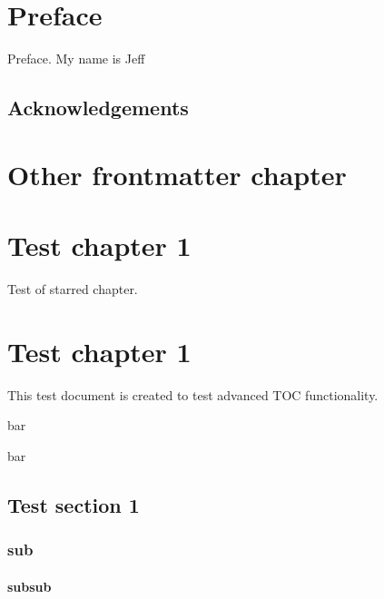 \documentclass{book}
\begin{document}
%

\frontmatter

\chapter{Preface}
Preface. My name is Jeff

\section{Acknowledgements}

\chapter[Other]{Other frontmatter chapter}

\tableofcontents

\mainmatter

\chapter*{Test chapter 1}
Test of starred chapter.

\chapter{Test chapter 1}
This test document is created to test advanced TOC functionality.

\begin{table}
  \caption[foo]{bar}
\end{table}
\begin{table}
  \caption[foo] {bar}
\end{table}

\section{Test section 1}

\subsection{sub}

\subsubsection{subsub}
\end{document}
